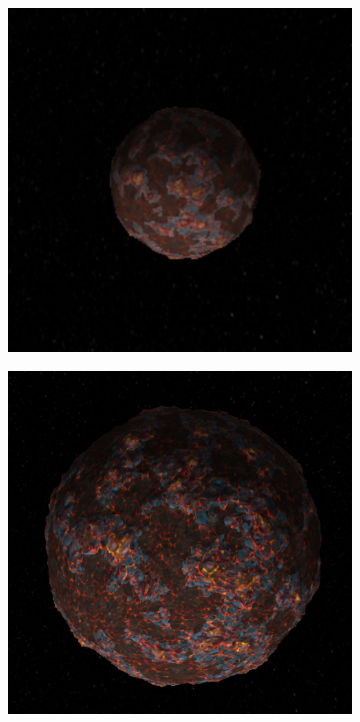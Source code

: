 \documentclass[paper=a4, fontsize=11pt]{scrartcl} %
\numberwithin{equation}{section} %
\numberwithin{figure}{section} %
\numberwithin{table}{section} %
\theoremstyle{definition}
\begin{document}
\begin{figure}
	\centering
	\begin{subfigure}{.3\textwidth}
		\centering
		\includegraphics[width=1.0\linewidth]{images/venus_d0.png}
	\end{subfigure}
	\begin{subfigure}{.3\textwidth}
		\centering
		\includegraphics[width=1.0\linewidth]{images/venus_d1.png}

\end{subfigure}
\end{figure}
\end{document}
